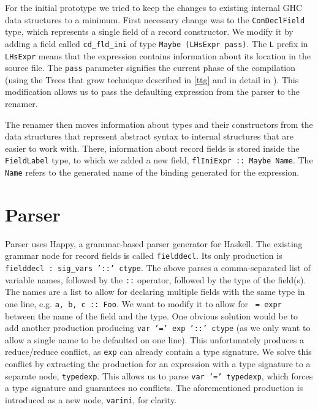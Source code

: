 \documentclass[en]{pracamgr}
\begin{document}
For the initial prototype we tried to keep the changes to existing internal GHC data structures to a minimum.
First necessary change was to the \texttt{ConDeclField} type, which represents a single field of a record constructor.
We modify it by adding a field called \texttt{cd\_fld\_ini} of type \texttt{Maybe (LHsExpr pass)}. 
The \texttt{L} prefix in \texttt{LHsExpr} means that the expression contains information about its location in the source file.
The \texttt{pass} parameter signifies the current phase of the compilation (using the Trees that grow technique described in \ref{ttg} and in detail in \cite{Najd2017TreesTG}).
This modification allows us to pass the defaulting expression from the parser to the renamer.

The renamer then moves information about types and their constructors from the data structures that represent abstract syntax to internal structures that are easier to work with.
There, information about record fields is stored inside the \texttt{FieldLabel} type, to which we added a new field, \texttt{flIniExpr :: Maybe Name}.
The \texttt{Name} refers to the generated name of the binding generated for the expression.

\section{Parser}
Parser uses Happy, a grammar-based parser generator for Haskell.
The existing grammar node for record fields is called \texttt{fielddecl}.
Its only production is \texttt{fielddecl : sig\_vars '::' ctype}.
The above parses a comma-separated list of variable names, followed by the \texttt{::} operator, followed by the type of the field(s).
The names are a list to allow for declaring multiple fields with the same type in one line, e.g. \texttt{a, b, c :: Foo}.
We want to modify it to allow for \texttt{ = expr} between the name of the field and the type.
One obvious solution would be to add another production producing \texttt{var '=' exp '::' ctype} (as we only want to allow a single name to be defaulted on one line).
This unfortunately produces a reduce/reduce conflict, as \texttt{exp} can already contain a type signature. 
We solve this conflict by extracting the production for an expression with a type signature to a separate node, \texttt{typedexp}.
This allows us to parse \texttt{var '=' typedexp}, which forces a type signature and guarantees no conflicts.
The aforementioned production is introduced as a new node, \texttt{varini}, for clarity.
\end{document}
